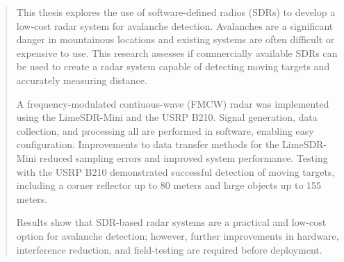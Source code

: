 \begin{abstract}  
	This thesis explores the use of software-defined radios (SDRs) to develop a low-cost radar
	system for avalanche detection.
	Avalanches are a significant danger in mountainous locations and existing systems are
	often difficult or expensive to use.
	This research assesses if commercially available SDRs can be used to create a radar
	system capable of detecting moving targets and accurately measuring distance.


	A frequency-modulated contiuous-wave (FMCW) radar was implemented using the LimeSDR-Mini
	and the USRP B210. Signal generation, data collection, and processing all are performed
	in software, enabling easy configuration. Improvements to data transfer methods
	for the LimeSDR-Mini reduced sampling errors and improved system performance.
	Testing with the USRP B210 demonstrated successful detection of moving targets,
	including a corner reflector up to 80 meters and large objects up to 155 meters.


	Results show that SDR-based radar systems are a practical and low-cost option
	for avalanche detection; however, further improvements in hardware, interference
	reduction, and field-testing are required before deployment.
\end{abstract}